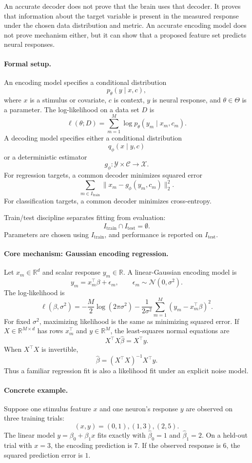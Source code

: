 An accurate decoder does not prove that the brain uses that decoder. It proves that information about the target variable is present in the measured response under the chosen data distribution and metric. An accurate encoding model does not prove mechanism either, but it can show that a proposed feature set predicts neural responses.

\paragraph{Formal setup.}
An encoding model specifies a conditional distribution
\[
p_\theta(y\mid x,c),
\]
where \(x\) is a stimulus or covariate, \(c\) is context, \(y\) is neural response, and \(\theta\in\Theta\) is a parameter. The log-likelihood on a data set \(D\) is
\[
\ell(\theta;D)=\sum_{m=1}^M \log p_\theta(y_m\mid x_m,c_m).
\]
A decoding model specifies either a conditional distribution
\[
q_\phi(x\mid y,c)
\]
or a deterministic estimator
\[
g_\phi:\mathcal Y\times\mathcal C\to\mathcal X.
\]
For regression targets, a common decoder minimizes squared error
\[
\sum_{m\in I_{\mathrm{train}}}\|x_m-g_\phi(y_m,c_m)\|_2^2.
\]
For classification targets, a common decoder minimizes cross-entropy.

Train/test discipline separates fitting from evaluation:
\[
I_{\mathrm{train}}\cap I_{\mathrm{test}}=\emptyset.
\]
Parameters are chosen using \(I_{\mathrm{train}}\), and performance is reported on \(I_{\mathrm{test}}\).

\paragraph{Core mechanism: Gaussian encoding regression.}
Let \(x_m\in\mathbb R^d\) and scalar response \(y_m\in\mathbb R\). A linear-Gaussian encoding model is
\[
y_m=x_m^\top\beta+\epsilon_m,\qquad \epsilon_m\sim\mathcal N(0,\sigma^2).
\]
The log-likelihood is
\[
\ell(\beta,\sigma^2)
=-\frac{M}{2}\log(2\pi\sigma^2)
-\frac{1}{2\sigma^2}\sum_{m=1}^M (y_m-x_m^\top\beta)^2.
\]
For fixed \(\sigma^2\), maximizing likelihood is the same as minimizing squared error. If \(X\in\mathbb R^{M\times d}\) has rows \(x_m^\top\) and \(y\in\mathbb R^M\), the least-squares normal equations are
\[
X^\top X\widehat\beta=X^\top y.
\]
When \(X^\top X\) is invertible,
\[
\widehat\beta=(X^\top X)^{-1}X^\top y.
\]
Thus a familiar regression fit is also a likelihood fit under an explicit noise model.

\paragraph{Concrete example.}
Suppose one stimulus feature \(x\) and one neuron's response \(y\) are observed on three training trials:
\[
(x,y)=(0,1),(1,3),(2,5).
\]
The linear model \(y=\beta_0+\beta_1x\) fits exactly with \(\widehat\beta_0=1\) and \(\widehat\beta_1=2\). On a held-out trial with \(x=3\), the encoding prediction is \(7\). If the observed response is \(6\), the squared prediction error is \(1\).

